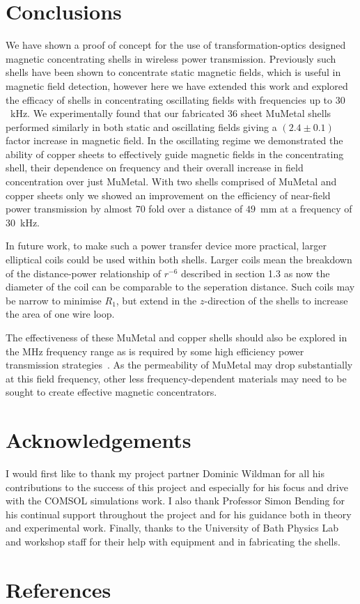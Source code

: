 \documentclass[11pt]{iopart}
\begin{document}
\section{Conclusions}

We have shown a proof of concept for the use of transformation-optics
designed magnetic concentrating shells in wireless power
transmission. Previously such shells have been shown to concentrate
static magnetic fields, which is useful in magnetic field detection, however here
we have extended this work and explored the efficacy of shells in
concentrating oscillating fields with frequencies up to $30$~kHz. We experimentally
found that our fabricated $36$ sheet MuMetal shells performed
similarly in both static and oscillating fields giving a $(2.4\pm0.1)$
factor increase in magnetic field. In the oscillating regime we
demonstrated the ability of copper sheets to effectively guide magnetic
fields in the concentrating shell, their dependence on frequency and their
overall increase in field concentration over just MuMetal. With two
shells comprised of MuMetal and copper sheets only we showed an
improvement on the efficiency of near-field power transmission by
almost $70$ fold over a distance of $49$~mm at a frequency of
$30$~kHz.

In future work, to make such a power transfer device more practical,
larger elliptical coils could be used within both shells. Larger coils
mean the breakdown of the distance-power relationship of $r^{-6}$ described in
section 1.3 as now the diameter of the coil can be comparable to the
seperation distance. Such coils may be narrow to minimise $R_1$, but
extend in the $z$-direction of the shells to increase the area of one
wire loop.

The effectiveness of these MuMetal and copper shells should also be
explored in the MHz frequency range as is required by some high
efficiency power transmission strategies~\cite{Kurs2007}. As the
permeability of MuMetal may drop substantially at this field
frequency, other less frequency-dependent materials may need to be
sought to create effective magnetic concentrators.

\section{Acknowledgements}
I would first like to thank my project partner Dominic Wildman for all
his contributions to the success of this project and especially for
his focus and drive with the COMSOL simulations work.  I also thank
Professor Simon Bending for his continual support throughout the
project and for his guidance both in theory and experimental work.
Finally, thanks to the University of Bath Physics Lab and workshop
staff for their help with equipment and in fabricating the shells.

\section{References}




\end{document}
